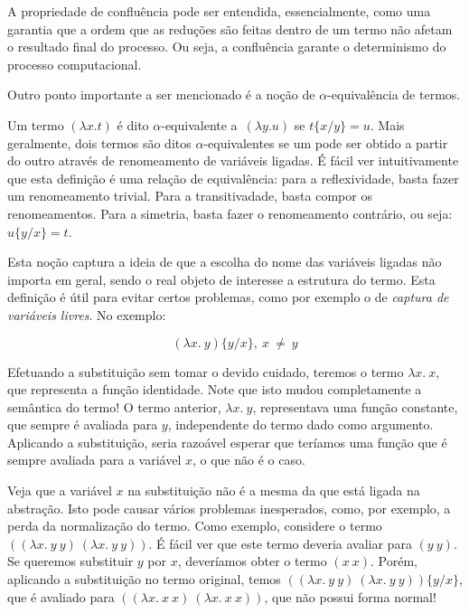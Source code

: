 A propriedade de confluência pode ser entendida, essencialmente, como uma
garantia que a ordem que as reduções são feitas dentro de um termo não afetam o
resultado final do processo. Ou seja, a confluência garante o determinismo do
processo computacional.


Outro ponto importante a ser mencionado é a noção de $\alpha$-equivalência de
termos. 

\begin{definicao}
    Um termo $(\lambda x. t)$ é dito $\alpha$-equivalente a\ $(\lambda y. u)$ se
    $ t\{x/y\} = u $. Mais geralmente, dois termos são ditos
    $\alpha$-equivalentes se um pode ser obtido a partir do outro através de
    renomeamento de variáveis ligadas. É fácil ver intuitivamente que esta
    definição é uma relação de equivalência: para a reflexividade, basta fazer
    um renomeamento trivial. Para a transitivadade, basta compor os
    renomeamentos.  Para a simetria, basta fazer o renomeamento contrário, ou
    seja: $ u\{y/x\} = t $.
\end{definicao}

Esta noção captura a ideia de que a escolha do nome das
variáveis ligadas não importa em geral, sendo o real objeto de interesse a
estrutura do termo. Esta definição é útil para evitar certos problemas, como por
exemplo o de \textit{captura de variáveis livres}. No exemplo:

\[ (\lambda x.\ y)\{y/x\},\ x\ \neq\ y \]

Efetuando a substituição sem tomar o devido cuidado, teremos o termo $\lambda
x.\ x$, que representa a função identidade. Note que isto mudou completamente a
semântica do termo! O termo anterior, $\lambda x.\ y$, representava uma função
constante, que sempre é avaliada para $y$, independente do termo dado como
argumento. Aplicando a substituição, seria razoável esperar que teríamos uma
função que é sempre avaliada para a variável $x$, o que não é o caso. 

Veja que a variável $x$ na substituição não é a mesma da que está ligada na
abstração. Isto pode causar vários problemas inesperados, como, por exemplo, a
perda da normalização do termo.  Como exemplo, considere o termo $((\lambda x.\
y\ y)\ (\lambda x.\ y\ y))$. É fácil ver que este termo deveria avaliar para
$(y\ y)$. Se queremos substituir $y$ por $x$, deveríamos obter o termo $(x\ x)$.
Porém, aplicando a substituição no termo original, temos $((\lambda x.\ y\ y)\
(\lambda x.\ y\ y))\{y/x\}$, que é avaliado para $((\lambda x.\ x\ x)\ (\lambda
x.\ x\ x))$, que não possui forma normal!

